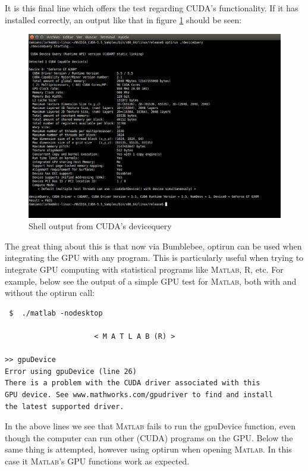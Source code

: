 \documentclass[a4paper,10pt]{article}
\begin{document}
It is this final line which offers the test regarding CUDA's functionality.  If
it has installed correctly, an output like that in figure \ref{fig:CUDA} should
be seen:
\begin{figure}[htpb!]
\begin{center}
\includegraphics[width=\textwidth]{devicequery.eps} 
\caption{Shell output from CUDA's devicequery}
\label{fig:CUDA}
\end{center}
\end{figure}

The great thing about this is that now via Bumblebee, optirun can be used when
integrating the GPU with any program.  This is particularly useful when trying 
to integrate GPU computing with statistical programs like \textsc{Matlab}, R, 
etc.  For example, below see the output of a simple GPU test for 
\textsc{Matlab}, both with and without the optirun call:


\begin{verbatim}
 $  ./matlab -nodesktop
 
                     < M A T L A B (R) >

>> gpuDevice
Error using gpuDevice (line 26)
There is a problem with the CUDA driver associated with this
GPU device. See www.mathworks.com/gpudriver to find and install
the latest supported driver.
\end{verbatim}


In the above lines we see that \textsc{Matlab} fails to run the gpuDevice 
function, even though the computer can run other (CUDA) programs on the GPU.
Below the same thing is attempted, however using optirun when opening 
\textsc{Matlab}.  In this case it \textsc{Matlab}'s GPU functions work as 
expected.
\end{document}

